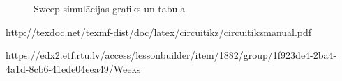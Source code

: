 \documentclass{report}
\begin{document}
\begin{figure}[!tb]
\caption{Sweep simulācijas grafiks un tabula}
\label{i:example}
\end{figure}


\begin{thebibliography}{9}

http://texdoc.net/texmf-dist/doc/latex/circuitikz/circuitikzmanual.pdf

https://edx2.etf.rtu.lv/access/lessonbuilder/item/1882/group/1f923de4-2ba4-4a1d-8cb6-41ede04eea49/Weeks%

\end{thebibliography}
\end{document}
